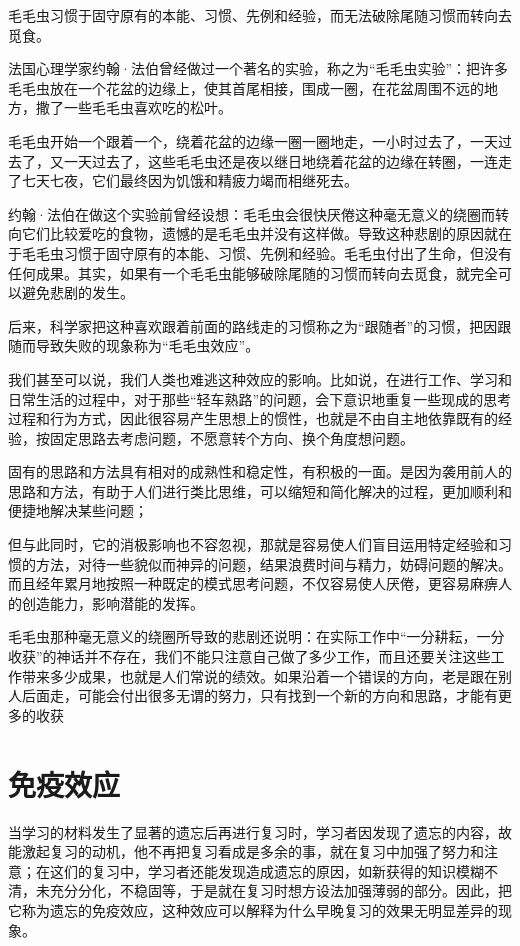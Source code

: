 \documentclass[11pt]{ctexart}
\begin{document}
毛毛虫习惯于固守原有的本能、习惯、先例和经验，而无法破除尾随习惯而转向去觅食。

法国心理学家约翰·法伯曾经做过一个著名的实验，称之为“毛毛虫实验”：把许多毛毛虫放在一个花盆的边缘上，使其首尾相接，围成一圈，在花盆周围不远的地方，撒了一些毛毛虫喜欢吃的松叶。

毛毛虫开始一个跟着一个，绕着花盆的边缘一圈一圈地走，一小时过去了，一天过去了，又一天过去了，这些毛毛虫还是夜以继日地绕着花盆的边缘在转圈，一连走了七天七夜，它们最终因为饥饿和精疲力竭而相继死去。

约翰·法伯在做这个实验前曾经设想：毛毛虫会很快厌倦这种毫无意义的绕圈而转向它们比较爱吃的食物，遗憾的是毛毛虫并没有这样做。导致这种悲剧的原因就在于毛毛虫习惯于固守原有的本能、习惯、先例和经验。毛毛虫付出了生命，但没有任何成果。其实，如果有一个毛毛虫能够破除尾随的习惯而转向去觅食，就完全可以避免悲剧的发生。

后来，科学家把这种喜欢跟着前面的路线走的习惯称之为“跟随者”的习惯，把因跟随而导致失败的现象称为“毛毛虫效应”。

我们甚至可以说，我们人类也难逃这种效应的影响。比如说，在进行工作、学习和日常生活的过程中，对于那些“轻车熟路”的问题，会下意识地重复一些现成的思考过程和行为方式，因此很容易产生思想上的惯性，也就是不由自主地依靠既有的经验，按固定思路去考虑问题，不愿意转个方向、换个角度想问题。

固有的思路和方法具有相对的成熟性和稳定性，有积极的一面。是因为袭用前人的思路和方法，有助于人们进行类比思维，可以缩短和简化解决的过程，更加顺利和便捷地解决某些问题；

但与此同时，它的消极影响也不容忽视，那就是容易使人们盲目运用特定经验和习惯的方法，对待一些貌似而神异的问题，结果浪费时间与精力，妨碍问题的解决。而且经年累月地按照一种既定的模式思考问题，不仅容易使人厌倦，更容易麻痹人的创造能力，影响潜能的发挥。

毛毛虫那种毫无意义的绕圈所导致的悲剧还说明：在实际工作中“一分耕耘，一分收获”的神话并不存在，我们不能只注意自己做了多少工作，而且还要关注这些工作带来多少成果，也就是人们常说的绩效。如果沿着一个错误的方向，老是跟在别人后面走，可能会付出很多无谓的努力，只有找到一个新的方向和思路，才能有更多的收获
\section{免疫效应}
\label{sec-66}


当学习的材料发生了显著的遗忘后再进行复习时，学习者因发现了遗忘的内容，故能激起复习的动机，他不再把复习看成是多余的事，就在复习中加强了努力和注意；在这们的复习中，学习者还能发现造成遗忘的原因，如新获得的知识模糊不清，未充分分化，不稳固等，于是就在复习时想方设法加强薄弱的部分。因此，把它称为遗忘的免疫效应，这种效应可以解释为什么早晚复习的效果无明显差异的现象。
\end{document}
